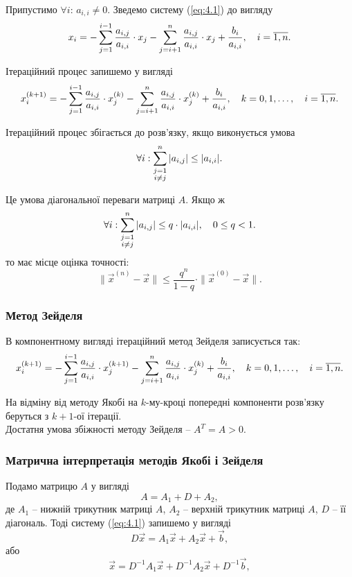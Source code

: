 Припустимо $\forall i$: $a_{i,i} \ne 0$. Зведемо систему (\ref{eq:4.1}) до вигляду
\[ x_i = -\displaystyle\sum\limits_{j=1}^{i-1} \dfrac{a_{i,j}}{a_{i,i}} \cdot x_j - \displaystyle\sum\limits_{j=i+1}^n \dfrac{a_{i,j}}{a_{i,i}} \cdot x_j + \dfrac{b_i}{a_{i,i}}, \quad i=\overline{1,n}. \]

Ітераційний процес запишемо у вигляді
\begin{equation}
	\label{eq:4.8}
	x_i^{(k+1)} = -\displaystyle\sum\limits_{j=1}^{i-1} \dfrac{a_{i,j}}{a_{i,i}} \cdot x_j^{(k)} - \displaystyle\sum\limits_{j=i+1}^n \dfrac{a_{i,j}}{a_{i,i}} \cdot x_j^{(k)} + \dfrac{b_i}{a_{i,i}}, \quad k = 0,1,\ldots, \quad i=\overline{1,n}.
\end{equation}

Ітераційний процес збігається до розв’язку, якщо виконується умова
\[ \forall i: \displaystyle\sum\limits_{\substack{j = 1 \\ i \ne j}}^n |a_{i,j}| \le |a_{i,i}|. \]

Це умова діагональної переваги матриці $A$. Якщо ж
\begin{equation}
	\label{eq:4.9}
	\forall i: \displaystyle\sum\limits_{\substack{j = 1 \\ i \ne j}}^n |a_{i,j}| \le q\cdot|a_{i,i}|, \quad 0 \le q < 1.
\end{equation}
то має місце оцінка точності:
\[ \|\vec x^{(n)} - \vec x\| \le \dfrac{q^n}{1-q}\cdot\|\vec x^{(0)}-\vec x\|. \]

\subsubsection{Метод Зейделя}
В компонентному вигляді ітераційний метод Зейделя записується так:
\begin{equation}
	\label{eq:4.10}
	x_i^{(k+1)} = -\displaystyle\sum\limits_{j=1}^{i-1} \dfrac{a_{i,j}}{a_{i,i}} \cdot x_j^{(k+1)} - \displaystyle\sum\limits_{j=i+1}^n \dfrac{a_{i,j}}{a_{i,i}} \cdot x_j^{(k)} + \dfrac{b_i}{a_{i,i}}, \quad k = 0,1,\ldots, \quad i=\overline{1,n}.
\end{equation}

На відміну від методу Якобі на $k$-му-кроці попередні компоненти розв'язку беруться з $k+1$-ої ітерації. \\

Достатня умова збіжності методу Зейделя -- $A^T = A > 0$.

\subsubsection{Матрична інтерпретація методів Якобі і Зейделя}

Подамо матрицю $A$ у вигляді \[ A = A_1 + D + A_2, \]
де $A_1$ -- нижній трикутник матриці $A$, $A_2$ -- верхній трикутник матриці $A$, $D$ -- її
діагональ. Тоді систему (\ref{eq:4.1}) запишемо у вигляді \[ D \vec x = A_1 \vec x + A_2 \vec x + \vec b,\]
або
\[ \vec x = D^{-1} A_1 \vec x + D^{-1} A_2 \vec x + D^{-1} \vec b,\]
 
